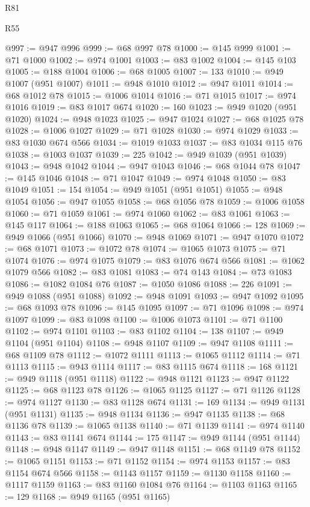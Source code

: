 \begin{lexlean}{R81}
\begin{lexlean}{R55}
\begin{coremodule}
{{{{{{{{{{{{{{{{{{{{{{{{{{{{{{{{{{{{{{{{{{{{{{{{{{{{{{{{{{{{{{@997 := @947 @996
@999 := @68 @997 @78
@1000 := @145 @999
@1001 := @71 @1000
@1002 := @974 @1001
@1003 := @83 @1002
@1004 := @145 @103
@1005 := @188 @1004
@1006 := @68 @1005
@1007 := 133
@1010 := @949 @1007 (@951 @1007)
@1011 := @948 @1010
@1012 := @947 @1011
@1014 := @68 @1012 @78
@1015 := @1006 @1014
@1016 := @71 @1015
@1017 := @974 @1016
@1019 := @83 @1017 @674
@1020 := 160
@1023 := @949 @1020 (@951 @1020)
@1024 := @948 @1023
@1025 := @947 @1024
@1027 := @68 @1025 @78
@1028 := @1006 @1027
@1029 := @71 @1028
@1030 := @974 @1029
@1033 := @83 @1030 @674 @566
@1034 := @1019 @1033
@1037 := @83 @1034 @115 @76
@1038 := @1003 @1037
@1039 := 225
@1042 := @949 @1039 (@951 @1039)
@1043 := @948 @1042
@1044 := @947 @1043
@1046 := @68 @1044 @78
@1047 := @145 @1046
@1048 := @71 @1047
@1049 := @974 @1048
@1050 := @83 @1049
@1051 := 154
@1054 := @949 @1051 (@951 @1051)
@1055 := @948 @1054
@1056 := @947 @1055
@1058 := @68 @1056 @78
@1059 := @1006 @1058
@1060 := @71 @1059
@1061 := @974 @1060
@1062 := @83 @1061
@1063 := @145 @117
@1064 := @188 @1063
@1065 := @68 @1064
@1066 := 128
@1069 := @949 @1066 (@951 @1066)
@1070 := @948 @1069
@1071 := @947 @1070
@1072 := @68 @1071
@1073 := @1072 @78
@1074 := @1065 @1073
@1075 := @71 @1074
@1076 := @974 @1075
@1079 := @83 @1076 @674 @566
@1081 := @1062 @1079 @566
@1082 := @83 @1081
@1083 := @74 @143
@1084 := @73 @1083
@1086 := @1082 @1084 @76
@1087 := @1050 @1086
@1088 := 226
@1091 := @949 @1088 (@951 @1088)
@1092 := @948 @1091
@1093 := @947 @1092
@1095 := @68 @1093 @78
@1096 := @145 @1095
@1097 := @71 @1096
@1098 := @974 @1097
@1099 := @83 @1098
@1100 := @1006 @1073
@1101 := @71 @1100
@1102 := @974 @1101
@1103 := @83 @1102
@1104 := 138
@1107 := @949 @1104 (@951 @1104)
@1108 := @948 @1107
@1109 := @947 @1108
@1111 := @68 @1109 @78
@1112 := @1072 @1111
@1113 := @1065 @1112
@1114 := @71 @1113
@1115 := @943 @1114
@1117 := @83 @1115 @674
@1118 := 168
@1121 := @949 @1118 (@951 @1118)
@1122 := @948 @1121
@1123 := @947 @1122
@1125 := @68 @1123 @78
@1126 := @1065 @1125
@1127 := @71 @1126
@1128 := @974 @1127
@1130 := @83 @1128 @674
@1131 := 169
@1134 := @949 @1131 (@951 @1131)
@1135 := @948 @1134
@1136 := @947 @1135
@1138 := @68 @1136 @78
@1139 := @1065 @1138
@1140 := @71 @1139
@1141 := @974 @1140
@1143 := @83 @1141 @674
@1144 := 175
@1147 := @949 @1144 (@951 @1144)
@1148 := @948 @1147
@1149 := @947 @1148
@1151 := @68 @1149 @78
@1152 := @1065 @1151
@1153 := @71 @1152
@1154 := @974 @1153
@1157 := @83 @1154 @674 @566
@1158 := @1143 @1157
@1159 := @1130 @1158
@1160 := @1117 @1159
@1163 := @83 @1160 @1084 @76
@1164 := @1103 @1163
@1165 := 129
@1168 := @949 @1165 (@951 @1165)
}}}}}}}}}}}}}}}}}}}}}}}}}}}}}}}}}}}}}}}}}}}}}}}}}}}}}}}}}}}}}}
\end{coremodule}
\end{lexlean}
\end{lexlean}

